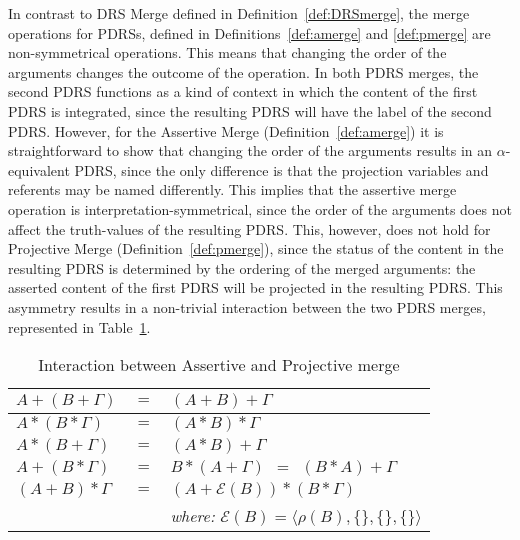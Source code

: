 \noindent In contrast to DRS Merge defined in Definition~\ref{def:DRSmerge},
the merge operations for PDRSs, defined in Definitions~\ref{def:amerge} and
\ref{def:pmerge} are non-symmetrical operations. This means that changing
the order of the arguments changes the outcome of the operation. In both
PDRS merges, the second PDRS functions as a kind of context in which the
content of the first PDRS is integrated, since the resulting PDRS will have
the label of the second PDRS. However, for the Assertive Merge
(Definition~\ref{def:amerge}) it is straightforward to show that changing
the order of the arguments results in an $\alpha$-equivalent PDRS, since the
only difference is that the projection variables and referents may be named
differently. This implies that the assertive merge operation is
interpretation-symmetrical, since the order of the arguments does not affect
the truth-values of the resulting PDRS. This, however, does not hold for
Projective Merge (Definition~\ref{def:pmerge}), since the status of the
content in the resulting PDRS is determined by the ordering of the merged
arguments: the asserted content of the first PDRS will be projected in the
resulting PDRS. This asymmetry results in a non-trivial interaction between
the two PDRS merges, represented in Table~\ref{tab:mergeinteractions}.

\begin{table}[h]
  \caption{Interaction between Assertive and Projective merge}
  \label{tab:mergeinteractions}
  \centering
  \begin{tabular}{| l c l |}
    \hline
    $A + (B + \Gamma)$ & $=$ & $(A + B) + \Gamma$\\
    \hline
    $A * (B * \Gamma)$ & $=$ & $(A * B) * \Gamma$\\
    \hline
    $A * (B + \Gamma)$ & $=$ & $(A * B) + \Gamma$\\
    \hline
    $A + (B * \Gamma)$ & $=$ & $B * (A + \Gamma) ~~=~~ (B * A) + \Gamma$\\
    \hline\hline
    $(A + B) * \Gamma$ & $=$ &  $(A + \mathcal{E}(B)) * (B * \Gamma)$\\
                       &&  \textit{where:} $\mathcal{E}(B) = \langle \rho(B), \{\}, \{\}, \{\}\rangle$\\
    \hline
  \end{tabular}
\end{table}

